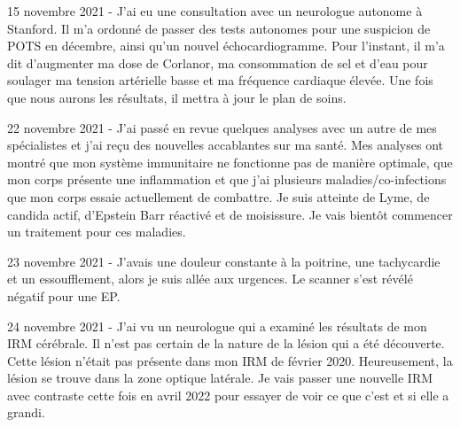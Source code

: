 15 novembre 2021 - J'ai eu une consultation avec un neurologue autonome à
Stanford. Il m'a ordonné de passer des tests autonomes pour une suspicion de
POTS en décembre, ainsi qu'un nouvel échocardiogramme. Pour l'instant, il m'a
dit d'augmenter ma dose de Corlanor, ma consommation de sel et d'eau pour
soulager ma tension artérielle basse et ma fréquence cardiaque élevée. Une fois
que nous aurons les résultats, il mettra à jour le plan de soins.

22 novembre 2021 - J'ai passé en revue quelques analyses avec un autre de mes
spécialistes et j'ai reçu des nouvelles accablantes sur ma santé. Mes analyses
ont montré que mon système immunitaire ne fonctionne pas de manière optimale,
que mon corps présente une inflammation et que j'ai plusieurs
maladies/co-infections que mon corps essaie actuellement de combattre. Je suis
atteinte de Lyme, de candida actif, d'Epstein Barr réactivé et de moisissure. Je
vais bientôt commencer un traitement pour ces maladies.

23 novembre 2021 - J'avais une douleur constante à la poitrine, une tachycardie
et un essoufflement, alors je suis allée aux urgences. Le scanner s'est révélé
négatif pour une EP.

24 novembre 2021 - J'ai vu un neurologue qui a examiné les résultats de mon IRM
cérébrale. Il n'est pas certain de la nature de la lésion qui a été
découverte. Cette lésion n'était pas présente dans mon IRM de février
2020. Heureusement, la lésion se trouve dans la zone optique latérale. Je vais
passer une nouvelle IRM avec contraste cette fois en avril 2022 pour essayer de
voir ce que c'est et si elle a grandi.

